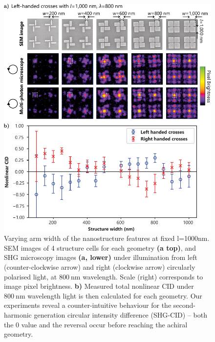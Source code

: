 \begin{figure}[htb!]	
    \centering	
    \includegraphics[scale=1]{./figures/results/EnantiomorphingChiralCrosses/l1000data.pdf}
    \caption{\label{fig:results:EnantiomorphingChiralCrosses:l1000data}
    Varying arm width of the nanostructure features at fixed l=1000nm. SEM images of 4 structure cells for each geometry \textbf{(a top)}, and SHG microscopy images \textbf{(a, lower)} under illumination from left (counter-clockwise arrow) and right (clockwise arrow) circularly polarised light, at $\SI{800}{\nano\m}$ wavelength. Scale (right) corresponds to image pixel brightness. \textbf{b)} Measured total nonlinear CID under $\SI{800}{\nano\m}$ wavelength light is then calculated for each geometry. Our experiments reveal a counter-intuitive behaviour for the second-harmonic generation circular intensity difference (SHG-CID) – both the 0 value and the reversal occur before reaching the achiral geometry.}	
\end{figure}

